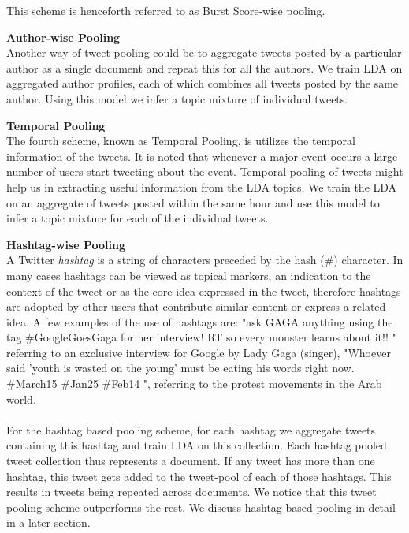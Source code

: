 \documentclass[10pt,a5paper,twoside]{article}
\begin{document}
\begin{compactenum}
This scheme is henceforth referred to as Burst Score-wise pooling.
\\

\item  \textbf{Author-wise Pooling}
\\
Another way of tweet pooling could be to aggregate tweets posted by a particular author as a single document and repeat this for all the authors. We train LDA on aggregated author profiles, each of which combines all tweets posted by the same author. Using this model we infer a topic mixture of individual tweets.
\\

\item  \textbf{Temporal Pooling}
\\
The fourth scheme, known as Temporal Pooling, is utilizes the temporal information of the tweets. It is noted that whenever a major event occurs a large number of users start tweeting about the event. Temporal pooling of tweets might help us in extracting useful information from the LDA topics. We train the LDA on an aggregate of tweets posted within the same hour and use this model to infer a topic mixture for each of the individual tweets.
\\

\item  \textbf{Hashtag-wise Pooling}
\\
A Twitter \textit{hashtag} is a string of characters preceded by the hash (\#) character. In many cases hashtags can be viewed as topical markers, an indication to the context of the tweet or as the core idea expressed in the tweet, therefore hashtags are adopted by other users that contribute similar content or express a related idea. A few examples of the use of hashtags are: "ask GAGA anything using the tag \#GoogleGoesGaga for her interview! RT so every monster learns about it!! " referring to an exclusive interview for Google by Lady Gaga (singer), "Whoever
said 'youth is wasted on the young' must be eating his words right now. \#March15 \#Jan25 \#Feb14 ", referring to the protest movements in the Arab world.
\\\\
For the hashtag based pooling scheme, for each hashtag we aggregate tweets containing this hashtag and train LDA on this collection. Each hashtag pooled tweet collection thus represents a document. If any tweet has more than one hashtag, this tweet gets added to the tweet-pool of each of those hashtags. This results in tweets being repeated across documents. We notice that this tweet pooling scheme outperforms the rest. We discuss hashtag based pooling in detail in a later section.

\end{compactenum}
\end{document}
